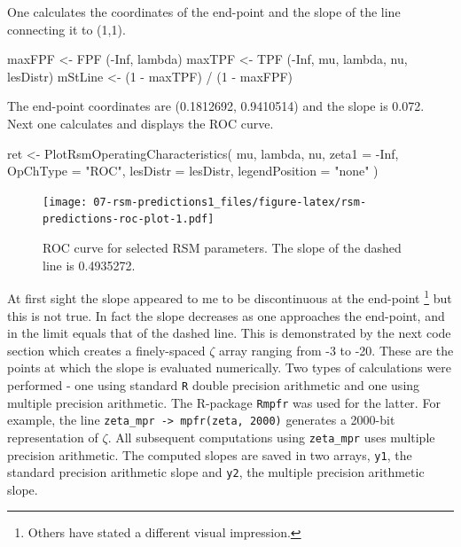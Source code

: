 \documentclass[
]{book}
\newenvironment{Shaded}{\begin{snugshade}}{\end{snugshade}}
\newcommand{\AttributeTok}[1]{\textcolor[rgb]{0.77,0.63,0.00}{#1}}
\newcommand{\ConstantTok}[1]{\textcolor[rgb]{0.00,0.00,0.00}{#1}}
\newcommand{\DecValTok}[1]{\textcolor[rgb]{0.00,0.00,0.81}{#1}}
\newcommand{\FunctionTok}[1]{\textcolor[rgb]{0.00,0.00,0.00}{#1}}
\newcommand{\NormalTok}[1]{#1}
\newcommand{\OtherTok}[1]{\textcolor[rgb]{0.56,0.35,0.01}{#1}}
\newcommand{\SpecialCharTok}[1]{\textcolor[rgb]{0.00,0.00,0.00}{#1}}
\newcommand{\StringTok}[1]{\textcolor[rgb]{0.31,0.60,0.02}{#1}}
\begin{document}
One calculates the coordinates of the end-point and the slope of the line connecting it to (1,1).

\begin{Shaded}
\begin{Highlighting}[]
\NormalTok{maxFPF }\OtherTok{\textless{}{-}} \FunctionTok{FPF}\NormalTok{ (}\SpecialCharTok{{-}}\ConstantTok{Inf}\NormalTok{, lambda)}
\NormalTok{maxTPF }\OtherTok{\textless{}{-}} \FunctionTok{TPF}\NormalTok{ (}\SpecialCharTok{{-}}\ConstantTok{Inf}\NormalTok{, mu, lambda, nu, lesDistr)}
\NormalTok{mStLine }\OtherTok{\textless{}{-}}\NormalTok{ (}\DecValTok{1} \SpecialCharTok{{-}}\NormalTok{ maxTPF) }\SpecialCharTok{/}\NormalTok{ (}\DecValTok{1} \SpecialCharTok{{-}}\NormalTok{ maxFPF)}
\end{Highlighting}
\end{Shaded}

The end-point coordinates are (0.1812692, 0.9410514) and the slope is 0.072. Next one calculates and displays the ROC curve.

\begin{Shaded}
\begin{Highlighting}[]
\NormalTok{ret }\OtherTok{\textless{}{-}} \FunctionTok{PlotRsmOperatingCharacteristics}\NormalTok{(}
\NormalTok{  mu,}
\NormalTok{  lambda,}
\NormalTok{  nu,}
  \AttributeTok{zeta1 =} \SpecialCharTok{{-}}\ConstantTok{Inf}\NormalTok{, }
  \AttributeTok{OpChType =} \StringTok{"ROC"}\NormalTok{,}
  \AttributeTok{lesDistr =}\NormalTok{ lesDistr,}
  \AttributeTok{legendPosition =} \StringTok{"none"}
\NormalTok{)}
\end{Highlighting}
\end{Shaded}

\begin{figure}
\centering
\texttt{[image: 07-rsm-predictions1\_files/figure-latex/rsm-predictions-roc-plot-1.pdf]}
\caption{\label{fig:rsm-predictions-roc-plot}ROC curve for selected RSM parameters. The slope of the dashed line is 0.4935272.}
\end{figure}

At first sight the slope appeared to me to be discontinuous at the end-point \footnote{Others have stated a different visual impression.} but this is not true. In fact the slope decreases as one approaches the end-point, and in the limit equals that of the dashed line. This is demonstrated by the next code section which creates a finely-spaced \(\zeta\) array ranging from -3 to -20. These are the points at which the slope is evaluated numerically. Two types of calculations were performed - one using standard \texttt{R} double precision arithmetic and one using multiple precision arithmetic. The R-package \texttt{Rmpfr} was used for the latter. For example, the line \texttt{zeta\_mpr\ -\textgreater{}\ mpfr(zeta,\ 2000)} generates a 2000-bit representation of \(\zeta\). All subsequent computations using \texttt{zeta\_mpr} uses multiple precision arithmetic. The computed slopes are saved in two arrays, \texttt{y1}, the standard precision arithmetic slope and \texttt{y2}, the multiple precision arithmetic slope.
\end{document}
